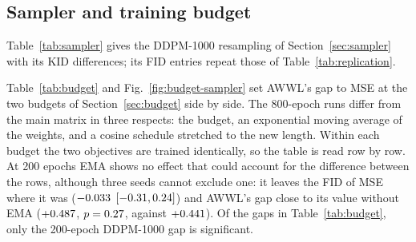 

\FloatBarrier
\subsection{Sampler and training budget}
\label{app:supp-budget}

Table~\ref{tab:sampler} gives the DDPM-1000 resampling of
Section~\ref{sec:sampler} with its KID differences; its FID entries repeat
those of Table~\ref{tab:replication}.


Table~\ref{tab:budget} and Fig.~\ref{fig:budget-sampler} set AWWL's gap to MSE
at the two budgets of Section~\ref{sec:budget} side by side. The 800-epoch
runs differ from the main matrix in three respects: the budget, an
exponential moving average of the weights, and a cosine schedule stretched to
the new length. Within each budget the two objectives are trained
identically, so the table is read row by row. At 200 epochs EMA shows no
effect that could account for the difference between the rows, although three
seeds cannot exclude one: it leaves the FID of MSE where it was ($-0.033$
$[-0.31, 0.24]$) and AWWL's gap close to its value without EMA
($+0.487$, $p = 0.27$, against $+0.441$). Of the gaps
in Table~\ref{tab:budget}, only the 200-epoch DDPM-1000 gap is significant.


